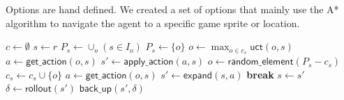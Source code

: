 Options are hand defined. We created a set of options that mainly use the A*
algorithm to navigate the agent to a specific game sprite or location.


\begin{algorithm}
	\caption{$\mathsf{O-MCTS}(r, max\_time, max\_depth)$}
	\label{alg:omcts}
	\begin{algorithmic}[1]
		\State $c \gets \emptyset$
		 \label{alg:omcts:mainloop}
			\State $s \gets r$ 
			 \label{alg:omcts:innerloop}
			 \label{alg:omcts:sp} 
				\State $P_s \gets \cup_o (s \in I_o)$ 
				\Else
					\State $P_s \gets \{o\}$ 
				\EndIf \label{alg:omcts:ep}
					\State $o \gets \max_{o \in c_s} \mathsf{uct}(o, s)$ \label{alg:omcts:uct} 
					\State $a \gets \mathsf{get\_action}(o, s)$ 
					\State $s' \gets \mathsf{apply\_action}(a, s)$ \label{alg:omcts:apply}
				\Else \label{alg:omcts:sexpand}
					\State $o \gets \mathsf{random\_element}(P_s - c_s)$ 
					\State $c_s \gets c_s \cup \{o\}$
					\State $a \gets \mathsf{get\_action}(o, s)$ 
					\State $s' \gets \mathsf{expand}(s, a)$ 
					\State \textbf{break} \label{alg:omcts:break}
				\EndIf \label{alg:omcts:eexpand}
				\State $s \gets s'$ \label{alg:omcts:ss} 
			\EndWhile
			\State $\delta \gets \mathsf{rollout}(s')$ \label{alg:omcts:rollout}
			\State $\mathsf{back\_up}(s', \delta)$ \label{alg:omcts:backup}
		\EndWhile
		\State {}
	\end{algorithmic}
\end{algorithm}


